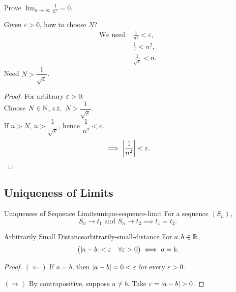 \newpage
\begin{example}[$1/n^2\to0$]
  Prove $\displaystyle\lim_{n\to\infty}\frac1{n^2}=0$.

  \begin{thinking}
    Given $\varepsilon>0$, how to choose $N$?
    \begin{align*}
      \text{We need } & \frac1{n^2}<\varepsilon,    \\
                      & \frac1\varepsilon<n^2,      \\
                      & \frac1{\sqrt\varepsilon}<n.
    \end{align*}
    Need $N>\dfrac1{\sqrt\varepsilon}$.
  \end{thinking}

  \begin{proof}
    For arbitrary $\varepsilon>0$:\\
    Choose $N\in\mathbb{N}$, s.t.\ $N>\dfrac1{\sqrt\varepsilon}$.\\
    If $n>N$, $n>\dfrac1{\sqrt\varepsilon}$, hence $\dfrac1{n^2}<\varepsilon$.
    \[
      \implies\left|\frac1{n^2}\right|<\varepsilon.\qedhere
    \]
  \end{proof}
\end{example}

\subsection{Uniqueness of Limits}

\begin{theorem}{Uniqueness of Sequence Limits}{unique-sequence-limit}
  For a sequence $(S_n)$,
  \[
    S_n\to t_1\text{ and }S_n\to t_2\implies t_1=t_2.
  \]
\end{theorem}

\begin{lemma}{Arbitrarily Small Distance}{arbitrarily-small-distance}
  For $a,b\in\mathbb{R}$,
  \[
    \bigl(\left\lvert a-b \right\rvert<\varepsilon\quad\forall\varepsilon>0\bigr)
    \iff a=b.
  \]
\end{lemma}

\begin{proof}
  $(\Leftarrow)$ If $a=b$, then $\left\lvert a-b \right\rvert=0<\varepsilon$ for every $\varepsilon>0$.

  $(\Rightarrow)$ By contrapositive, suppose $a\ne b$.
  Take $\varepsilon=\left\lvert a-b \right\rvert>0$.
\end{proof}

